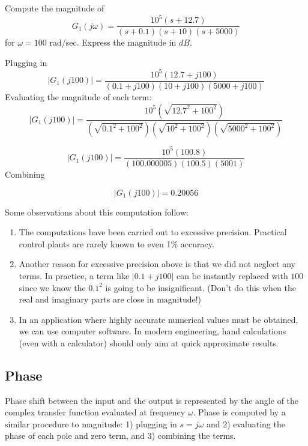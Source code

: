\begin{ExampleSmall}\label{examplemagnitude}
Compute the magnitude of
\[
G_1(j\omega) = \frac{10^5(s+12.7)}{(s+0.1)(s+10)(s+5000)}
\]
for $\omega = 100$ rad/sec.  Express the magnitude in $dB$.
\vspace{0.25in}

Plugging in
\[
|G_1(j100)| = \frac {10^5(12.7 + j100)}     {(0.1+j100)(10+j100)(5000+j100)}
\]
Evaluating the magnitude of each term:
\[
|G_1(j100)| = \frac {10^5(\sqrt{12.7^2 + 100^2})}     {(\sqrt{0.1^2+100^2})(\sqrt{10^2+100^2})(\sqrt{5000^2+100^2})}
\]

\[
|G_1(j100)| = \frac {10^5(100.8)}     {(100.000005)(100.5)(5001)}
\]
Combining

\[
|G_1(j100)| = 0.20056
\]

Some observations about this computation follow:


\begin{enumerate}
  \item  The computations have been carried out to excessive precision.   Practical control plants are rarely known to even 1\% accuracy.
  \item  Another reason for excessive precision above is that we did not neglect any terms.   In practice, a term like $|0.1+j100|$ can be instantly replaced with $100$ since we know the $0.1^2$ is going to be insignificant.  (Don't do this when the real and imaginary parts are close in magnitude!)
  \item  In an application where highly accurate numerical values must be obtained, we can use computer software.
 In modern engineering, hand calculations (even with a calculator) should only aim at quick approximate results.
\end{enumerate}

\end{ExampleSmall}


\subsection{Phase}

Phase shift between the input and the output is represented by the angle of the complex transfer function evaluated at frequency $\omega$.   Phase is computed by a similar procedure to magnitude:
1) plugging in $s=j\omega$ and
2) evaluating the phase of each pole and zero term, and
3) combining the terms.




